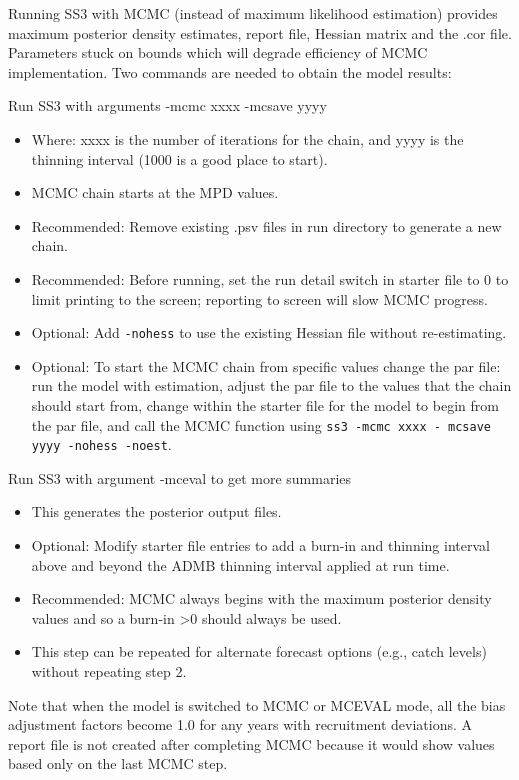  Running SS3 with MCMC (instead of maximum likelihood estimation) provides maximum posterior density estimates, report file, Hessian matrix and the .cor file. Parameters stuck on bounds which will degrade efficiency of MCMC implementation. Two commands are needed to obtain the model results:
 
\noindent Run SS3 with arguments -mcmc xxxx -mcsave yyyy
 \begin{itemize}
 	\item Where: xxxx is the number of iterations for the chain, and yyyy is the thinning interval (1000 is a good place to start).
 	\item MCMC chain starts at the MPD values.
 	\item Recommended: Remove existing .psv files in run directory to generate a new chain.
 	\item Recommended: Before running, set the run detail switch in starter file to 0 to limit printing to the screen; reporting to screen will slow MCMC progress.
 	\item Optional: Add \texttt{-nohess} to use the existing Hessian file without re-estimating.
 	\item Optional: To start the MCMC chain from specific values change the par file: run the model with estimation, adjust the par file to the values that the chain should start from, change within the starter file for the model to begin from the par file, and call the MCMC function using \texttt{ss3 -mcmc xxxx - mcsave yyyy -nohess -noest}.
 \end{itemize}
	
\noindent Run SS3 with argument -mceval to get more summaries
\begin{itemize}
	\item This generates the posterior output files.
	\item Optional: Modify starter file entries to add a burn-in and thinning interval above and beyond the ADMB thinning interval applied at run time.
	\item Recommended: MCMC always begins with the maximum posterior density values and so a burn-in >0 should always be used.
	\item This step can be repeated for alternate forecast options (e.g., catch levels) without repeating step 2.
\end{itemize}

Note that when the model is switched to MCMC or MCEVAL mode, all the bias adjustment factors become 1.0 for any years with recruitment deviations. A report file is not created after completing MCMC because it would show values based only on the last MCMC step.

\pagebreak
